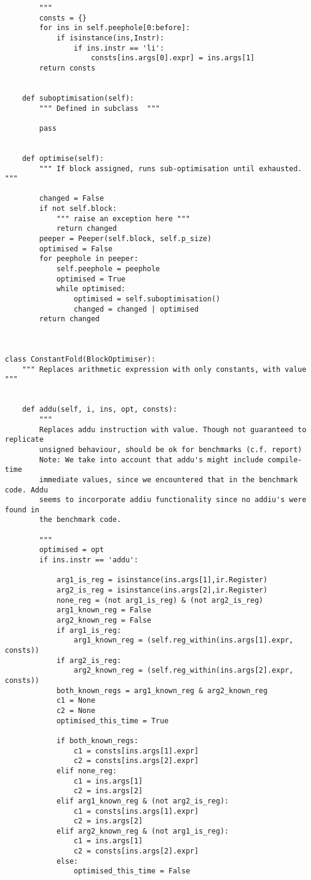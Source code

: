 \begin{lstlisting}
        """
        consts = {}
        for ins in self.peephole[0:before]:
            if isinstance(ins,Instr):
                if ins.instr == 'li':
                    consts[ins.args[0].expr] = ins.args[1]
        return consts


    def suboptimisation(self):
        """ Defined in subclass  """

        pass


    def optimise(self):
        """ If block assigned, runs sub-optimisation until exhausted. """

        changed = False
        if not self.block: 
            """ raise an exception here """
            return changed
        peeper = Peeper(self.block, self.p_size)
        optimised = False
        for peephole in peeper:
            self.peephole = peephole
            optimised = True
            while optimised:
                optimised = self.suboptimisation()
                changed = changed | optimised
        return changed



class ConstantFold(BlockOptimiser):
    """ Replaces arithmetic expression with only constants, with value """


    def addu(self, i, ins, opt, consts):
        """ 
        Replaces addu instruction with value. Though not guaranteed to replicate
        unsigned behaviour, should be ok for benchmarks (c.f. report)
        Note: We take into account that addu's might include compile-time
        immediate values, since we encountered that in the benchmark code. Addu
        seems to incorporate addiu functionality since no addiu's were found in
        the benchmark code.
        
        """    
        optimised = opt
        if ins.instr == 'addu':

            arg1_is_reg = isinstance(ins.args[1],ir.Register)
            arg2_is_reg = isinstance(ins.args[2],ir.Register)
            none_reg = (not arg1_is_reg) & (not arg2_is_reg)
            arg1_known_reg = False
            arg2_known_reg = False
            if arg1_is_reg:
                arg1_known_reg = (self.reg_within(ins.args[1].expr, consts))
            if arg2_is_reg:
                arg2_known_reg = (self.reg_within(ins.args[2].expr, consts))
            both_known_regs = arg1_known_reg & arg2_known_reg
            c1 = None
            c2 = None
            optimised_this_time = True

            if both_known_regs:
                c1 = consts[ins.args[1].expr]
                c2 = consts[ins.args[2].expr]
            elif none_reg:
                c1 = ins.args[1]
                c2 = ins.args[2]
            elif arg1_known_reg & (not arg2_is_reg):
                c1 = consts[ins.args[1].expr]
                c2 = ins.args[2]
            elif arg2_known_reg & (not arg1_is_reg):
                c1 = ins.args[1]
                c2 = consts[ins.args[2].expr]
            else:
                optimised_this_time = False


\end{lstlisting}
